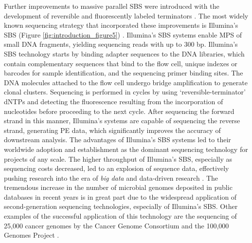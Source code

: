 Further improvements to massive parallel \ac{SBS} were introduced with the development of reversible and fluorescently labeled terminators \cite{turcatti_new_2008}. The most widely known sequencing strategy that incorporated these improvements is Illumina’s \ac{SBS} (Figure \ref{fig:introduction_figure5}) \cite{uhlen_sequential_2023, bentley_accurate_2008, fedurco_bta_2006}. Illumina’s \ac{SBS} systems enable \ac{MPS} of small \ac{DNA} fragments, yielding sequencing reads with up to 300 bp. Illumina’s \ac{SBS} technology starts by binding adapter sequences to the \ac{DNA} libraries, which contain complementary sequences that bind to the flow cell, unique indexes or barcodes for sample identification, and the sequencing primer binding sites. The \ac{DNA} molecules attached to the flow cell undergo bridge amplification to generate clonal clusters. Sequencing is performed in cycles by using ‘reversible-terminator’ \ac{dNTPs} and detecting the fluorescence resulting from the incorporation of nucleotides before proceeding to the next cycle. After sequencing the forward strand in this manner, Illumina’s systems are capable of sequencing the reverse strand, generating \ac{PE} data, which significantly improves the accuracy of downstream analysis. The advantages of Illumina’s \ac{SBS} systems led to their worldwide adoption and establishment as the dominant sequencing technology for projects of any scale. The higher throughput of Illumina’s \ac{SBS}, especially as sequencing costs decreased, led to an explosion of sequence data, effectively pushing research into the era of \textit{big data} and data-driven research \cite{uhlen_sequential_2023}. The tremendous increase in the number of microbial genomes deposited in public databases in recent years is in great part due to the widespread application of second-generation sequencing technologies, especially of Illumina’s \ac{SBS}. Other examples of the successful application of this technology are the sequencing of 25,000 cancer genomes by the Cancer Genome Consortium \cite{zhang_international_2019} and the 100,000 Genomes Project \cite{the_100000_genomes_project_pilot_investigators_100000_2021}.


